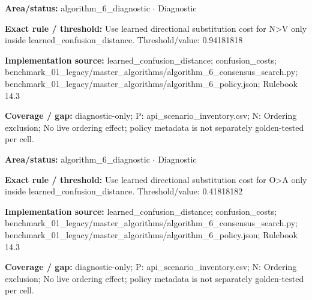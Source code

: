 \begin{tcolorbox}[enhanced,breakable,colback=white,colframe=Muted!45,boxrule=0.45pt,arc=1.5pt,left=6pt,right=6pt,top=5pt,bottom=5pt,title={\texttt{A6-LEARNED-SUBSTITUTION-N-V}},title after break={\texttt{A6-LEARNED-SUBSTITUTION-N-V}\ (continued)},fonttitle=\headingfont\bfseries\color{Navy},coltitle=Navy]
\textbf{Area/status:} algorithm\_\allowbreak{}6\_\allowbreak{}diagnostic $\boldsymbol{\cdot}$ Diagnostic\par
\smallskip
\textbf{Exact rule / threshold:} Use learned directional substitution cost for N>V only inside learned\_\allowbreak{}confusion\_\allowbreak{}distance. Threshold/\allowbreak{}value: 0.94181818\par
\smallskip
\textbf{Implementation source:} learned\_\allowbreak{}confusion\_\allowbreak{}distance; confusion\_\allowbreak{}costs; benchmark\_\allowbreak{}01\_\allowbreak{}legacy/\allowbreak{}master\_\allowbreak{}algorithms/\allowbreak{}algorithm\_\allowbreak{}6\_\allowbreak{}consensus\_\allowbreak{}search.py; benchmark\_\allowbreak{}01\_\allowbreak{}legacy/\allowbreak{}master\_\allowbreak{}algorithms/\allowbreak{}algorithm\_\allowbreak{}6\_\allowbreak{}policy.json; Rulebook 14.3\par
\smallskip
\textbf{Coverage / gap:} diagnostic-only; P: api\_\allowbreak{}scenario\_\allowbreak{}inventory.csv; N: Ordering exclusion; No live ordering effect; policy metadata is not separately golden-tested per cell.
\end{tcolorbox}
\begin{tcolorbox}[enhanced,breakable,colback=white,colframe=Muted!45,boxrule=0.45pt,arc=1.5pt,left=6pt,right=6pt,top=5pt,bottom=5pt,title={\texttt{A6-LEARNED-SUBSTITUTION-O-A}},title after break={\texttt{A6-LEARNED-SUBSTITUTION-O-A}\ (continued)},fonttitle=\headingfont\bfseries\color{Navy},coltitle=Navy]
\textbf{Area/status:} algorithm\_\allowbreak{}6\_\allowbreak{}diagnostic $\boldsymbol{\cdot}$ Diagnostic\par
\smallskip
\textbf{Exact rule / threshold:} Use learned directional substitution cost for O>A only inside learned\_\allowbreak{}confusion\_\allowbreak{}distance. Threshold/\allowbreak{}value: 0.41818182\par
\smallskip
\textbf{Implementation source:} learned\_\allowbreak{}confusion\_\allowbreak{}distance; confusion\_\allowbreak{}costs; benchmark\_\allowbreak{}01\_\allowbreak{}legacy/\allowbreak{}master\_\allowbreak{}algorithms/\allowbreak{}algorithm\_\allowbreak{}6\_\allowbreak{}consensus\_\allowbreak{}search.py; benchmark\_\allowbreak{}01\_\allowbreak{}legacy/\allowbreak{}master\_\allowbreak{}algorithms/\allowbreak{}algorithm\_\allowbreak{}6\_\allowbreak{}policy.json; Rulebook 14.3\par
\smallskip
\textbf{Coverage / gap:} diagnostic-only; P: api\_\allowbreak{}scenario\_\allowbreak{}inventory.csv; N: Ordering exclusion; No live ordering effect; policy metadata is not separately golden-tested per cell.
\end{tcolorbox}
